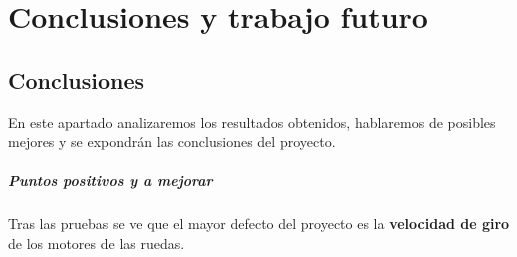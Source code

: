 \documentclass[twoside, 12pt]{epstfg}
\begin{document}
%
%
%
%
%
%
%
%






\chapter{Conclusiones y trabajo futuro}
\label{chap:conclusiones}
\vspace{-0.2cm}

\section{Conclusiones}
En este apartado analizaremos los resultados obtenidos, hablaremos de posibles mejores y se expondrán las conclusiones del proyecto.

\paragraph{Puntos positivos y a mejorar}

Tras las pruebas se ve que el mayor defecto del proyecto es la \textbf{velocidad de giro} de los motores de las ruedas.
\end{document}
